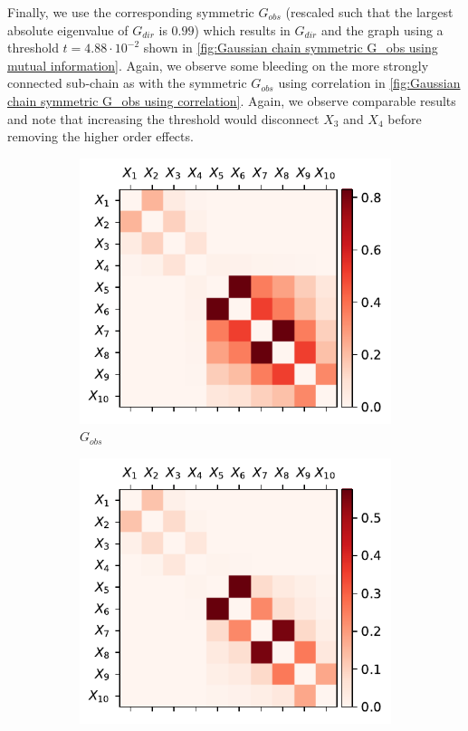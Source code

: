 \documentclass[../Thesis.tex]{subfiles}
\begin{document}
Finally, we use the corresponding symmetric $G_{obs}$ (rescaled such that the largest absolute eigenvalue of $G_{dir}$ is $0.99$) which results in $G_{dir}$ and the graph using a threshold $t=4.88\cdot 10^{-2}$ shown in \autoref{fig:Gaussian chain symmetric G_obs using mutual information}. Again, we observe some bleeding on the more strongly connected sub-chain as with the symmetric $G_{obs}$ using correlation in \autoref{fig:Gaussian chain symmetric G_obs using correlation}. Again, we observe comparable results and note that increasing the threshold would disconnect $X_3$ and $X_4$ before removing the higher order effects.
\begin{figure}[ht]
    \centering
    \begin{subfigure}[t]{0.49\textwidth}
        \centering
        \includegraphics[width=.95\linewidth]{figures/Gaussian Chain Theoretical/symmetric G obs - MI.pdf}
        \caption{$G_{obs}$}
    \end{subfigure}
    \hfill
    \begin{subfigure}[t]{0.49\textwidth}
        \centering
        \includegraphics[width=.95\linewidth]{figures/Gaussian Chain Theoretical/G dir from symmetric G obs - MI.pdf}

\end{subfigure}
\end{figure}
\end{document}
